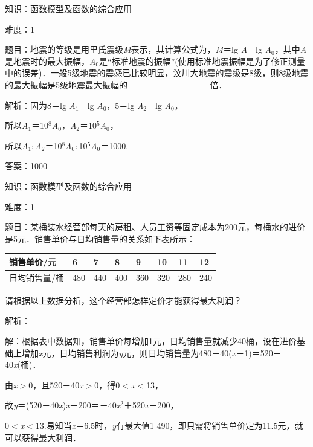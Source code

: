 \documentclass{article} %
\begin{document}
知识：函数模型及函数的综合应用

难度：1

题目：地震的等级是用里氏震级\textit{M}表示，其计算公式为，\textit{M}＝lg \textit{A}－lg \textit{A}${}_{0}$，其中\textit{A}是地震时的最大振幅，\textit{A}${}_{0}$是``标准地震的振幅''(使用标准地震振幅是为了修正测量中的误差)．一般5级地震的震感已比较明显，汶川大地震的震级是8级，则8级地震的最大振幅是5级地震最大振幅的\_\_\_\_\_\_\_\_\_\_\_\_\_倍．

解析：因为8＝lg \textit{A}${}_{1}$－lg \textit{A}${}_{0}$，5＝lg \textit{A}${}_{2}$－lg \textit{A}${}_{0}$，

所以\textit{A}${}_{1}$＝10${}^{8}$\textit{A}${}_{0}$，\textit{A}${}_{2}$＝10${}^{5}$\textit{A}${}_{0}$，

所以\textit{A}${}_{1}$$\mathrm{:}$\textit{A}${}_{2}$＝10${}^{8}$\textit{A}${}_{0}$$\mathrm{:}$10${}^{5}$\textit{A}${}_{0}$＝1000.

答案：1000

知识：函数模型及函数的综合应用

难度：1

题目：某桶装水经营部每天的房租、人员工资等固定成本为200元，每桶水的进价是5元．销售单价与日均销售量的关系如下表所示：



\begin{tabular}{|p{1.0in}|p{0.3in}|p{0.3in}|p{0.3in}|p{0.3in}|p{0.3in}|p{0.3in}|p{0.3in}|} \hline
	销售单价/元\textit{} & 6\textit{} & 7\textit{} & 8\textit{} & 9\textit{} & 10\textit{} & 11\textit{} & 12 \\ \hline
	日均销售量/桶\textit{} & 480\textit{} & 440\textit{} & 400\textit{} & 360\textit{} & 320\textit{} & 280\textit{} & 240 \\ \hline
\end{tabular}

请根据以上数据分析，这个经营部怎样定价才能获得最大利润？

解析：

解：根据表中数据知，销售单价每增加1元，日均销售量就减少40桶，设在进价基础上增加\textit{x}元，日均销售利润为\textit{y}元，则日均销售量为480－40(\textit{x}－1)＝520－40\textit{x}(桶)．

由\textit{x}$\mathrm{>}$0，且520－40\textit{x}$\mathrm{>}$0，得0$\mathrm{<}$\textit{x}$\mathrm{<}$13，

故\textit{y}＝(520－40\textit{x})\textit{x}－200＝－40\textit{x}${}^{2}$＋520\textit{x}－200，

0$\mathrm{<}$\textit{x}$\mathrm{<}$13.易知当\textit{x}＝6.5时，\textit{y}有最大值1 490，即只需将销售单价定为11.5元，就可以获得最大利润．
\end{document}
